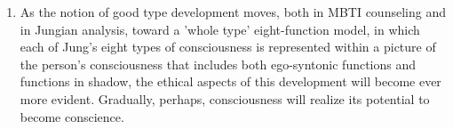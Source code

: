 \begin{enumerate}
    \item {} As the notion of good type
        development moves, both in MBTI counseling and in Jungian analysis,
        toward a 'whole type' eight-function model,  in which each of Jung's
        eight types of consciousness is represented within a picture of the
        person's consciousness that includes both ego-syntonic functions and
        functions in shadow, the ethical aspects of this development will
        become ever more evident. Gradually, perhaps, consciousness will
        realize its potential to become conscience.

\end{enumerate}
